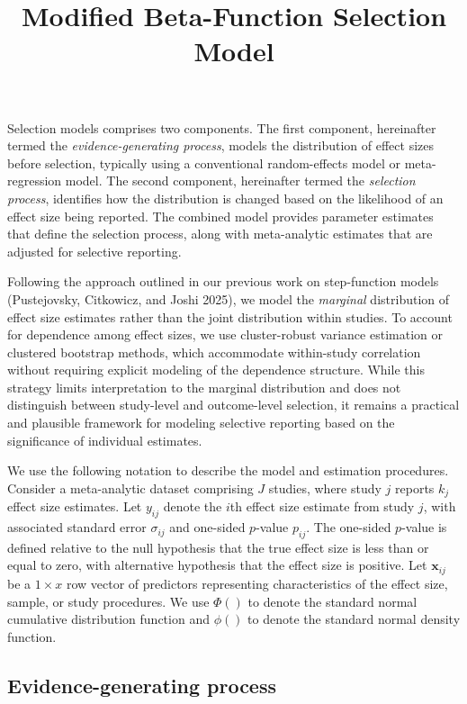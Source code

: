 \documentclass[
]{article}
\title{Modified Beta-Function Selection Model}
\author{}
\date{\vspace{-2.5em}}
\begin{document}
\maketitle

Selection models comprises two components. The first component,
hereinafter termed the \emph{evidence-generating process}, models the
distribution of effect sizes before selection, typically using a
conventional random-effects model or meta-regression model. The second
component, hereinafter termed the \emph{selection process}, identifies
how the distribution is changed based on the likelihood of an effect
size being reported. The combined model provides parameter estimates
that define the selection process, along with meta-analytic estimates
that are adjusted for selective reporting.

Following the approach outlined in our previous work on step-function
models (Pustejovsky, Citkowicz, and Joshi 2025), we model the
\emph{marginal} distribution of effect size estimates rather than the
joint distribution within studies. To account for dependence among
effect sizes, we use cluster-robust variance estimation or clustered
bootstrap methods, which accommodate within-study correlation without
requiring explicit modeling of the dependence structure. While this
strategy limits interpretation to the marginal distribution and does not
distinguish between study-level and outcome-level selection, it remains
a practical and plausible framework for modeling selective reporting
based on the significance of individual estimates.

We use the following notation to describe the model and estimation
procedures. Consider a meta-analytic dataset comprising \(J\) studies,
where study \(j\) reports \(k_j\) effect size estimates. Let \(y_{ij}\)
denote the \(i\)th effect size estimate from study \(j\), with
associated standard error \(\sigma_{ij}\) and one-sided \(p\)-value
\(p_{ij}\). The one-sided \(p\)-value is defined relative to the null
hypothesis that the true effect size is less than or equal to zero, with
alternative hypothesis that the effect size is positive. Let
\(\mathbf{x}_{ij}\) be a \(1 \times x\) row vector of predictors
representing characteristics of the effect size, sample, or study
procedures. We use \(\Phi()\) to denote the standard normal cumulative
distribution function and \(\phi()\) to denote the standard normal
density function.

\subsection{Evidence-generating
process}\label{evidence-generating-process}
\end{document}
